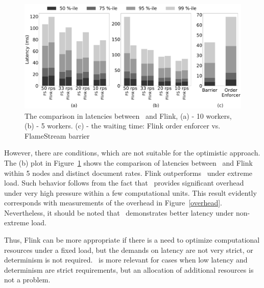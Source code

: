 \begin{figure}[ht]
  \centering
  \includegraphics[width=\textwidth]{pics/comp-index-quantiles}
  \caption{The comparison in latencies between \FlameStream\ and Flink, (a) - 10 workers, (b) - 5 workers. (c) - the waiting time: Flink order enforcer vs. FlameStream barrier}
  \label {fs-index-quantiles}
\end{figure}

However, there are conditions, which are not suitable for the optimistic approach. The (b) plot in Figure~\ref{fs-index-quantiles} shows the comparison of latencies between \FlameStream\ and Flink within 5 nodes and distinct document rates. Flink outperforms \FlameStream\ under extreme load. Such behavior follows from the fact that \FlameStream\ provides significant overhead under very high pressure within a few computational units. This result evidently corresponds with measurements of the overhead in Figure~\ref{overhead}. Nevertheless, it should be noted that \FlameStream\ demonstrates better latency under non-extreme load.

Thus, Flink can be more appropriate if there is a need to optimize computational resources under a fixed load, but the demands on latency are not very strict, or determinism is not required. \FlameStream\ is more relevant for cases when low latency and determinism are strict requirements, but an allocation of additional resources is not a problem.  
